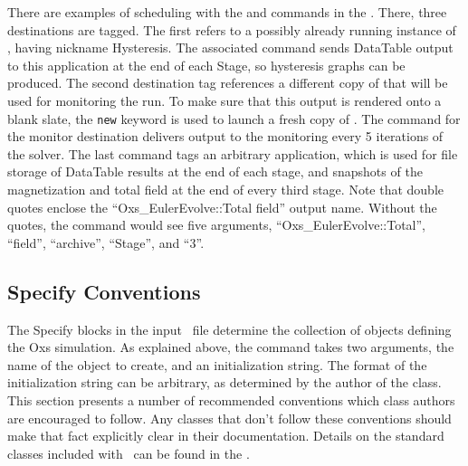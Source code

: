 \begin{description}
There are examples of scheduling with the  and
 commands in the .  There,
three destinations are tagged.  The first refers to a possibly already
running instance of , having nickname Hysteresis.  The
associated  command sends DataTable output to this
application at the end of each Stage, so hysteresis graphs can be
produced.  The second destination tag references a different copy of
 that will be used for monitoring the run.  To make sure
that this output is rendered onto a blank slate, the \texttt{new}
keyword is used to launch a fresh copy of .  The
 command for the monitor destination delivers output to
the monitoring  every 5 iterations of the solver.  The last
 command tags an arbitrary  application,
which is used for file storage of DataTable results at the end of each
stage, and snapshots of the magnetization and total field at the end of
every third stage.  Note that double quotes enclose the
``Oxs\_EulerEvolve::Total field'' output name.  Without the quotes, the
 command would see five arguments,
``Oxs\_EulerEvolve::Total'', ``field'', ``archive'', ``Stage'', and
``3''.
\end{description}

\subsection{Specify Conventions}%
\label{sec:specConventions}
The Specify blocks in the input \MIF\ file determine the collection
of  objects defining the Oxs simulation.  As explained
above, the  command takes two
arguments, the name of the  object to create, and an
initialization string.  The format of the initialization string can
be arbitrary, as determined by the author of the  class.
This section presents a number of recommended conventions which
 class authors are encouraged to follow.  Any 
classes that don't follow these conventions should make that fact
explicitly clear in their documentation.
Details on the standard  classes included with \OOMMF\ can
be found in the
.

